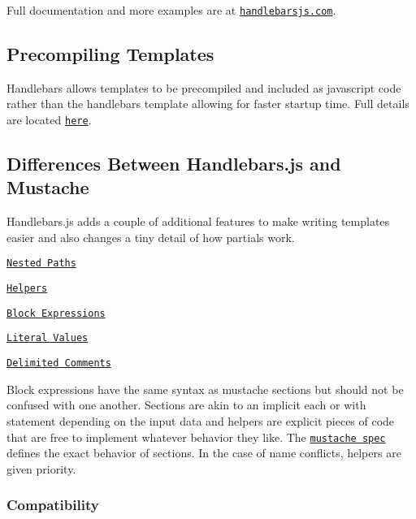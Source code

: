 Full documentation and more examples are at \href{http://handlebarsjs.com/}{\tt handlebarsjs.\+com}.

\subsection*{Precompiling Templates }

Handlebars allows templates to be precompiled and included as javascript code rather than the handlebars template allowing for faster startup time. Full details are located \href{http://handlebarsjs.com/precompilation.html}{\tt here}.

\subsection*{Differences Between Handlebars.\+js and Mustache }

Handlebars.\+js adds a couple of additional features to make writing templates easier and also changes a tiny detail of how partials work.


\begin{DoxyItemize}
\item \href{http://handlebarsjs.com/#paths}{\tt Nested Paths}
\item \href{http://handlebarsjs.com/#helpers}{\tt Helpers}
\item \href{http://handlebarsjs.com/#block-expressions}{\tt Block Expressions}
\item \href{http://handlebarsjs.com/#literals}{\tt Literal Values}
\item \href{http://handlebarsjs.com/#comments}{\tt Delimited Comments}
\end{DoxyItemize}

Block expressions have the same syntax as mustache sections but should not be confused with one another. Sections are akin to an implicit {\ttfamily each} or {\ttfamily with} statement depending on the input data and helpers are explicit pieces of code that are free to implement whatever behavior they like. The \href{http://mustache.github.io/mustache.5.html}{\tt mustache spec} defines the exact behavior of sections. In the case of name conflicts, helpers are given priority.

\subsubsection*{Compatibility}

